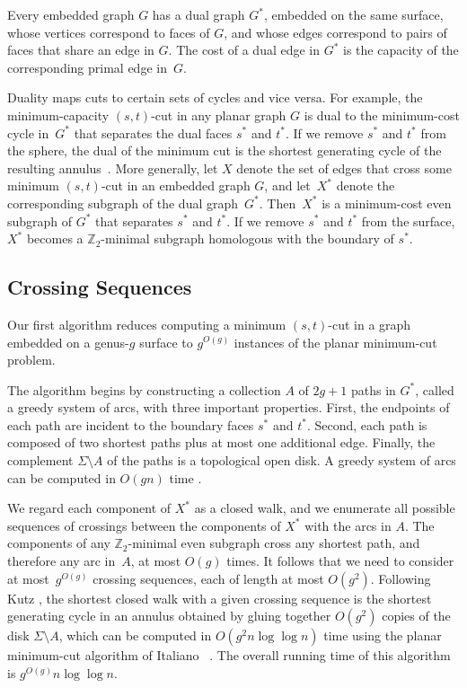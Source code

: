 \documentclass[natbib]{svcyclop}
\begin{document}
Every embedded graph $G$ has a dual graph $G^*$, embedded on the same surface, whose vertices correspond to faces of $G$, and whose edges correspond to pairs of faces that share an edge in $G$.
The cost of a dual edge in $G^*$ is the capacity of the corresponding primal edge in~$G$.  

Duality maps cuts to certain sets of cycles and vice versa.  For example, the minimum-capacity $(s,t)$-cut in any planar graph $G$ is dual to the minimum-cost  cycle in~$G^*$ that separates the dual faces $s^*$ and $t^*$.  If we remove $s^*$ and $t^*$ from the sphere, the dual of the minimum cut is the shortest generating cycle of the resulting annulus~\cite{is-mfpn-79, r-mstcp-83}.  More generally, let $X$ denote the set of edges that cross some minimum $(s,t)$-cut in an embedded graph $G$, and let~$X^*$ denote the corresponding subgraph of the dual graph~$G^*$.  Then~$X^*$ is a minimum-cost even subgraph of $G^*$ that separates $s^*$ and $t^*$.  If we remove  $s^*$ and $t^*$ from the surface, $X^*$ becomes a $\mathbb{Z}_2$-minimal subgraph homologous with the boundary of $s^*$.

\subsection{Crossing Sequences}

Our first algorithm \cite{cen-mcshc-09} reduces computing a minimum $(s,t)$-cut in a graph embedded on a genus-$g$ surface to $g^{O(g)}$ instances of the planar minimum-cut problem.

The algorithm begins by constructing a collection $A$ of $2g+1$ paths in $G^*$, called a greedy system of arcs, with three important properties.  First, the endpoints of each path are incident to the boundary faces $s^*$ and $t^*$.  Second, each path is composed of two shortest paths plus at most one additional edge.  Finally, the complement $\Sigma\setminus A$ of the paths is a topological open disk.  A greedy system of arcs can be computed in $O(gn)$ time \cite{ccelw-scsih-08,en-mcsnc-11}.

We regard each component of $X^*$ as a closed walk, and we enumerate all possible sequences of crossings between the components of $X^*$ with the arcs in $A$.
The components of any $\mathbb{Z}_2$-minimal even subgraph cross any shortest path, and therefore any arc in~$A$, at most $O(g)$ times.  It follows that we need to consider at most~$g^{O(g)}$ crossing sequences, each of length at most $O(g^2)$.
Following Kutz \cite{k-csnco-06}, the shortest closed walk with a given crossing sequence is the shortest generating cycle in an annulus obtained by gluing together $O(g^2)$ copies of the disk $\Sigma\setminus A$, which can be computed in $O(g^2n\log\log n)$ time using the planar minimum-cut algorithm of Italiano \etal~\cite{insw-iamcmf-11}.
The overall running time of this algorithm is $g^{O(g)}n\log\log n$.
\end{document}
